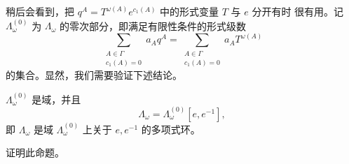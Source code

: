 稍后会看到，把 $q^A=T^{\omega(A)}e^{c_1(A)}$ 中的形式变量 $T$ 与 $e$ 分开有时
很有用。记 $\Lambda_\omega^{(0)}$ 为 $\Lambda_\omega$ 的零次部分，即满足\personNovikov{}有限性条件的形式级数
\[
 \sum_{\substack{A\in\Gamma\\c_1(A)=0}}a_Aq^A
 =\sum_{\substack{A\in\Gamma\\c_1(A)=0}}a_AT^{\omega(A)}
\]
的集合。显然，我们需要验证下述结论。

\begin{proposition}
\label{prop:degree-zero-novikov-field}
$\Lambda_\omega^{(0)}$ 是域，并且
\[
 \Lambda_\omega=\Lambda_\omega^{(0)}[e,e^{-1}],
\]
即 $\Lambda_\omega$ 是域 $\Lambda_\omega^{(0)}$ 上关于 $e,e^{-1}$ 的多项式环。
\end{proposition}

\begin{exercise}
\label{ex:prove-degree-zero-novikov-field}
证明此命题。
\end{exercise}
